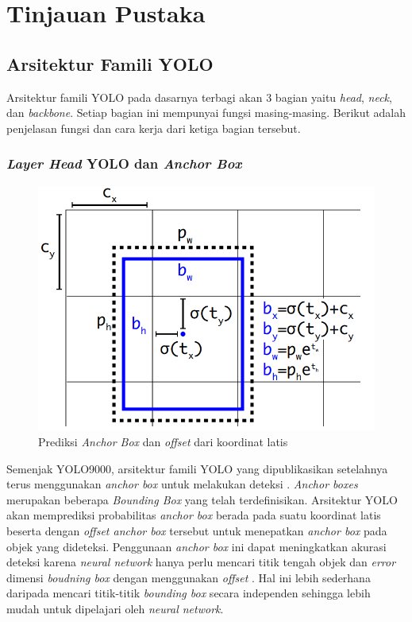 \section{Tinjauan Pustaka}
\subsection{Arsitektur Famili YOLO}
  Arsitektur famili YOLO pada dasarnya terbagi akan 3 bagian yaitu \emph{head}, \emph{neck}, dan \emph{backbone}.
  Setiap bagian ini mempunyai fungsi masing-masing.
  Berikut adalah penjelasan fungsi dan cara kerja dari ketiga bagian tersebut.
  \subsubsection{\emph{Layer Head} YOLO dan \emph{Anchor Box}}
    \begin{figure}[ht]
        \centering
        \includegraphics[scale=0.4]{pictures/anchorbox.png}
        \caption{Prediksi \emph{Anchor Box} dan \emph{offset} dari koordinat latis}
        \label{fig:anchorbox}
    \end{figure}
    Semenjak YOLO9000, arsitektur famili YOLO yang dipublikasikan setelahnya terus menggunakan \emph{anchor box} untuk melakukan deteksi \parencites{yolov2}{yolov3}{yolov4}{scaledyolov4}{yolov5}{yolor}{yolov7}.
    \emph{Anchor boxes} merupakan beberapa \emph{Bounding Box} yang telah terdefinisikan. 
    Arsitektur YOLO akan memprediksi probabilitas \emph{anchor box} berada pada suatu koordinat latis beserta dengan \emph{offset anchor box} tersebut untuk menepatkan \emph{anchor box} pada objek yang dideteksi.
    Penggunaan \emph{anchor box} ini dapat meningkatkan akurasi deteksi karena \emph{neural network} hanya perlu mencari titik tengah objek dan \emph{error} dimensi \emph{boudning box} dengan menggunakan \emph{offset} \parencite{yolov3}.
    Hal ini lebih sederhana daripada mencari titik-titik \emph{bounding box} secara independen sehingga lebih mudah untuk dipelajari oleh \emph{neural network}.

